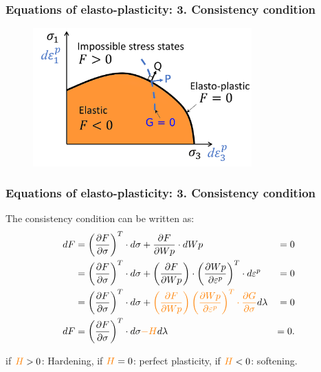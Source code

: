 \documentclass[notes]{beamer}
\begin{document}
\begin{frame}
\frametitle{Equations of elasto-plasticity: 3. Consistency condition}
\begin{figure}
	\includegraphics[width=0.75\textwidth]{figs/yield.png}
\end{figure}
\end{frame}

\begin{frame}
\frametitle{Equations of elasto-plasticity: 3. Consistency condition}
The consistency condition can be written as:
	\begin{align*}
	dF & = \left(\frac{\partial F}{\partial \sigma}\right)^T \cdot d \sigma + \frac{\partial F}{\partial Wp}\cdot dWp & = 0 \\
	 & = \left(\frac{\partial F}{\partial \sigma}\right)^T \cdot d \sigma + \left(\frac{\partial F}{\partial Wp}\right)\cdot \left(\frac{\partial Wp}{\partial \varepsilon^p}\right)^T\cdot d \varepsilon^p & = 0 \\
	 & = \left(\frac{\partial F}{\partial \sigma}\right)^T \cdot d \sigma + \textcolor{orange}{\left(\frac{\partial F}{\partial Wp}\right)\left(\frac{\partial Wp}{\partial \varepsilon^p}\right)^T\cdot\frac{\partial G}{\partial 	\sigma}} d\lambda  & = 0 \\
	dF & = \left(\frac{\partial F}{\partial \sigma}\right)^T \cdot d \sigma \textcolor{orange}{-H} d\lambda & = 0.
	\end{align*}

	if $\textcolor{orange}{H} > 0$: Hardening, if $\textcolor{orange}{H} = 0$: perfect plasticity, if $\textcolor{orange}{H} < 0$: softening.
\end{frame}
\end{document}
